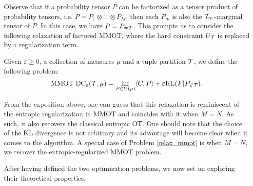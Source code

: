 Observe that if a probability tensor $P$ can be factorized as a tensor product of probability tensors, i.e.
$P = P_1 \otimes ... \otimes P_M$, then each $P_m$ is also the $\mathcal T_m$-marginal tensor of $P$. In this case,
we have $P = P_{\# \mathcal T}$. This prompts us to consider the following relaxation of factored MMOT, where the hard constraint
$U_{\mathcal T}$ is replaced by a regularization term.
\begin{definition}
  Given $\varepsilon \geq 0$, a collection of measures $\mu$ and a tuple partition $\mathcal T$,
  we define the following problem:
  \begin{equation} \label{relax_mmot}
    \text{MMOT-DC}_{\varepsilon}( \mathcal T, \mu) =
    \inf_{P \in U(\mu)} \langle C, P \rangle + \varepsilon \text{KL}(P \vert P_{\# \mathcal T}).
  \end{equation}
\end{definition}
From the exposition above, one can guess that this relaxation is reminiscent of the entropic regularization in MMOT and
coincides with it when $M = N$. As such, it also recovers the classical entropic OT. One should note that the choice of the KL
divergence is not arbitrary and its advantage will become clear when it comes to the algorithm. %
A special case of Problem \eqref{relax_mmot} is when $M = N$, we recover the entropic-regularized MMOT problem.

After having defined the two optimization problems, we now set on exploring their theoretical properties.

